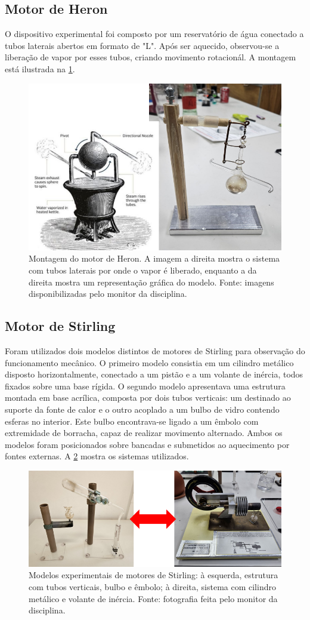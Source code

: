 \subsection{Motor de Heron}
O dispositivo experimental foi composto por um reservatório de água conectado a tubos laterais abertos em formato de "L". Após ser aquecido, observou-se a liberação de vapor por esses tubos, criando movimento rotacionál. A montagem está ilustrada na \cref{fig:eron}.

\begin{figure}[H]
\centering
\includegraphics[width=0.42\linewidth]{fig/eron.png}
\caption{Montagem do motor de Heron. A imagem a direita mostra o sistema com tubos laterais por onde o vapor é liberado, enquanto a da direita mostra um representação gráfica do modelo. Fonte: imagens disponibilizadas pelo monitor da disciplina.}
\label{fig:eron}
\end{figure}

\subsection{Motor de Stirling}
Foram utilizados dois modelos distintos de motores de Stirling para observação do funcionamento mecânico. O primeiro modelo consistia em um cilindro metálico disposto horizontalmente, conectado a um pistão e a um volante de inércia, todos fixados sobre uma base rígida. O segundo modelo apresentava uma estrutura montada em base acrílica, composta por dois tubos verticais: um destinado ao suporte da fonte de calor e o outro acoplado a um bulbo de vidro contendo esferas no interior. Este bulbo encontrava-se ligado a um êmbolo com extremidade de borracha, capaz de realizar movimento alternado. Ambos os modelos foram posicionados sobre bancadas e submetidos ao aquecimento por fontes externas. A \cref{fig:stirling} mostra os sistemas utilizados.

\begin{figure}[H]
\centering
\includegraphics[width=0.55\linewidth]{fig/stirling.png}
\caption{Modelos experimentais de motores de Stirling: à esquerda, estrutura com tubos verticais, bulbo e êmbolo; à direita, sistema com cilindro metálico e volante de inércia. Fonte: fotografia feita pelo monitor da disciplina.}
\label{fig:stirling}
\end{figure}

